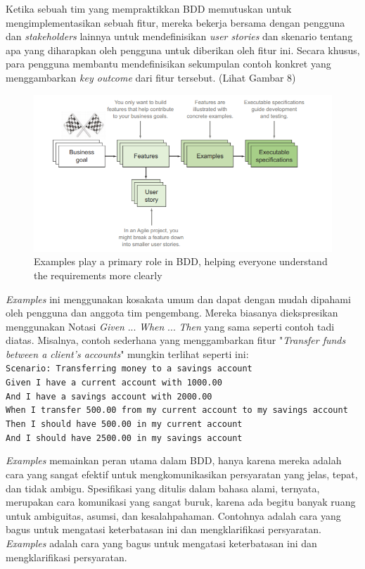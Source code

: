 \documentclass[a4paper,twoside]{article}
\begin{document}
\begin{enumerate}
Ketika sebuah tim yang mempraktikkan BDD memutuskan untuk mengimplementasikan sebuah fitur, mereka bekerja bersama dengan pengguna dan \textit{stakeholders} lainnya untuk mendefinisikan \textit{user stories} dan skenario tentang apa yang diharapkan oleh pengguna untuk diberikan oleh fitur ini. Secara khusus, para pengguna membantu mendefinisikan sekumpulan contoh konkret yang menggambarkan \textit{key outcome} dari fitur tersebut. (Lihat Gambar 8)
\begin{figure}
	\includegraphics[scale=1.2]{../DokumenSkripsi/gambar/skenario}
	\centering
	\caption{Examples play a primary role in BDD, helping everyone understand the
requirements more clearly}
\end{figure}

\textit{Examples} ini menggunakan kosakata umum dan dapat dengan mudah dipahami oleh pengguna dan anggota tim pengembang. Mereka biasanya diekspresikan menggunakan Notasi \textit{Given} ... \textit{When} ... \textit{Then} yang sama seperti contoh tadi diatas. Misalnya, contoh sederhana yang menggambarkan fitur "\textit{Transfer funds between a client’s accounts}" mungkin terlihat seperti ini:\\
\texttt{Scenario: Transferring money to a savings account\\
 Given I have a current account with 1000.00\\
 And I have a savings account with 2000.00\\
 When I transfer 500.00 from my current account to my savings account\\
 Then I should have 500.00 in my current account\\
 And I should have 2500.00 in my savings account\\}
 
\textit{Examples} memainkan peran utama dalam BDD, hanya karena mereka adalah cara yang sangat efektif untuk mengkomunikasikan persyaratan yang jelas, tepat, dan tidak ambigu. Spesifikasi yang ditulis dalam bahasa alami, ternyata, merupakan cara komunikasi yang sangat buruk, karena ada begitu banyak ruang untuk ambiguitas, asumsi, dan kesalahpahaman. Contohnya adalah cara yang bagus untuk mengatasi keterbatasan ini dan mengklarifikasi persyaratan. \textit{Examples} adalah cara yang bagus untuk mengatasi keterbatasan ini dan mengklarifikasi persyaratan.


\end{enumerate}
\end{document}
